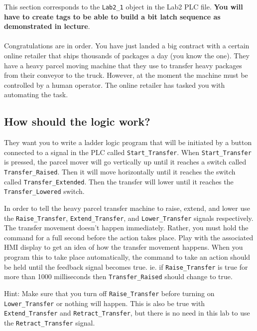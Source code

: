 This section corresponds to the \verb|Lab2_1| object in the Lab2 PLC file. \textbf{You will have to create tags to be able to build a bit latch sequence as demonstrated in lecture}.
\\ 
\\

Congratulations are in order. You have just landed a big contract with a certain online retailer that ships thousands of packages a day (you know the one). They have a heavy parcel moving machine that they use to transfer heavy packages from their conveyor to the truck. However, at the moment the machine must be controlled by a human operator. The online retailer has tasked you with automating the task. 


\subsection{How should the logic work?}


They want you to write a ladder logic program that will be initiated by a button connected to a signal in the PLC called \verb|Start_Transfer|. When \verb|Start_Transfer| is pressed, the parcel mover will go vertically up until it reaches a switch called \verb|Transfer_Raised|. Then it will move horizontally until it reaches the switch called \verb|Transfer_Extended|. Then the transfer will lower until it reaches the \verb|Transfer_Lowered| switch. 


In order to tell the heavy parcel transfer machine to raise, extend, and lower use the \verb|Raise_Transfer|, \verb|Extend_Transfer|, and \verb|Lower_Transfer| signals respectively. The transfer movement doesn't happen immediately. Rather, you must hold the command for a full second before the action takes place. Play with the associated HMI display to get an idea of how the transfer movement happens. When you program this to take place automatically, the command to take an action should be held until the feedback signal becomes true. ie. if \verb|Raise_Transfer| is true for more than 1000 milliseconds then \verb|Transfer_Raised| should change to true.

Hint: Make sure that you turn off \verb|Raise_Transfer| before turning on \verb|Lower_Transfer| or nothing will happen. This is also be true with \verb|Extend_Transfer| and \verb|Retract_Transfer|, but there is no need in this lab to use the \verb|Retract_Transfer| signal.

